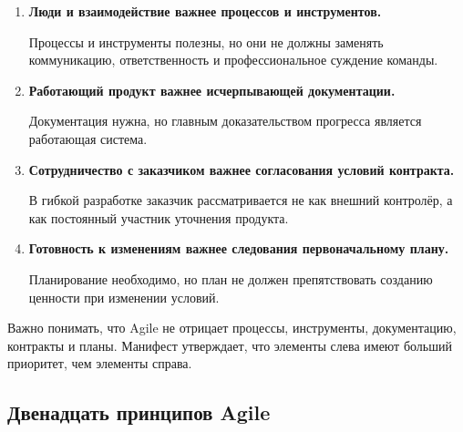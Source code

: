 \documentclass[12pt,a4paper]{article}
\begin{document}
\begin{enumerate}
    \item \textbf{Люди и взаимодействие важнее процессов и инструментов.}

    Процессы и инструменты полезны, но они не должны заменять коммуникацию, ответственность и профессиональное суждение команды.

    \item \textbf{Работающий продукт важнее исчерпывающей документации.}

    Документация нужна, но главным доказательством прогресса является работающая система.

    \item \textbf{Сотрудничество с заказчиком важнее согласования условий контракта.}

    В гибкой разработке заказчик рассматривается не как внешний контролёр, а как постоянный участник уточнения продукта.

    \item \textbf{Готовность к изменениям важнее следования первоначальному плану.}

    Планирование необходимо, но план не должен препятствовать созданию ценности при изменении условий.
\end{enumerate}

Важно понимать, что Agile не отрицает процессы, инструменты, документацию, контракты и планы. Манифест утверждает, что элементы слева имеют больший приоритет, чем элементы справа.

\subsection{Двенадцать принципов Agile}
\end{document}
